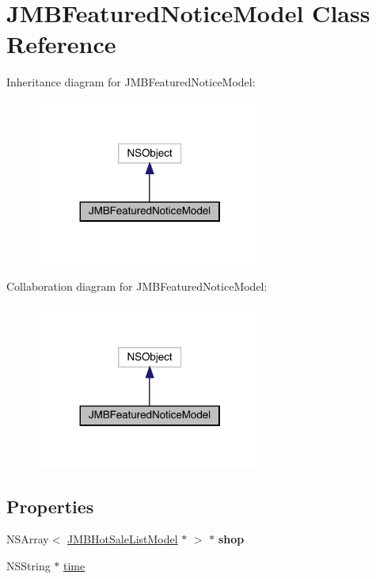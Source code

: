 \hypertarget{interface_j_m_b_featured_notice_model}{}\section{J\+M\+B\+Featured\+Notice\+Model Class Reference}
\label{interface_j_m_b_featured_notice_model}


Inheritance diagram for J\+M\+B\+Featured\+Notice\+Model\+:\nopagebreak
\begin{figure}[H]
\begin{center}
\leavevmode
\includegraphics[width=212pt]{interface_j_m_b_featured_notice_model__inherit__graph}
\end{center}
\end{figure}


Collaboration diagram for J\+M\+B\+Featured\+Notice\+Model\+:\nopagebreak
\begin{figure}[H]
\begin{center}
\leavevmode
\includegraphics[width=212pt]{interface_j_m_b_featured_notice_model__coll__graph}
\end{center}
\end{figure}
\subsection*{Properties}
\begin{DoxyCompactItemize}
\item 
\mbox{\label{interface_j_m_b_featured_notice_model_a64f91944bec142f74309b61a0895bc5f}} 
N\+S\+Array$<$ \mbox{\hyperlink{interface_j_m_b_hot_sale_list_model}{J\+M\+B\+Hot\+Sale\+List\+Model}} $\ast$ $>$ $\ast$ {\bfseries shop}
\item 
N\+S\+String $\ast$ \mbox{\hyperlink{interface_j_m_b_featured_notice_model_adf2aacf68a6e6c1ccecb72e3d7943132}{time}}
\end{DoxyCompactItemize}


